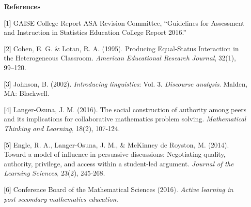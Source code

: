 \documentclass[11pt]{article}
\begin{document}
\medskip

{\bf References}

\smallskip

[1] GAISE College Report ASA Revision Committee, ``Guidelines for Assessment and Instruction in Statistics Education College Report 2016.''

[2] Cohen, E. G. \& Lotan, R. A. (1995). Producing Equal-Status Interaction in the Heterogeneous Classroom. \emph{American Educational Research Journal}, 32(1), 99–120.

[3] Johnson, B. (2002). \emph{Introducing linguistics}: Vol. 3. \emph{Discourse analysis}. Malden, MA: Blackwell. 

[4] Langer-Osuna, J. M. (2016). The social construction of authority among peers and its implications for collaborative mathematics problem solving. \emph{Mathematical Thinking and Learning}, 18(2), 107-124. 

[5] Engle, R. A., Langer-Osuna, J. M., \& McKinney de Royston, M. (2014). Toward a model of influence in persuasive discussions: Negotiating quality, authority, privilege, and access within a student-led argument. \emph{Journal of the Learning Sciences}, 23(2), 245-268.  

[6] Conference Board of the Mathematical Sciences (2016). \emph{Active learning in post-secondary mathematics education}.
\end{document}

